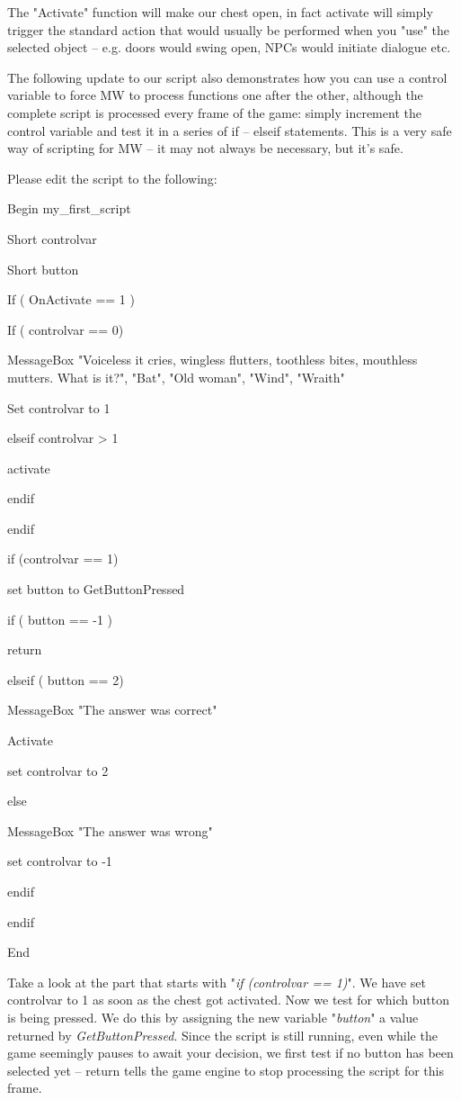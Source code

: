 \documentclass[
]{article}
\begin{document}
The "Activate" function will make our chest open, in fact activate will
simply trigger the standard action that would usually be performed when
you "use" the selected object -- e.g. doors would swing open, NPCs would
initiate dialogue etc.

The following update to our script also demonstrates how you can use a
control variable to force MW to process functions one after the other,
although the complete script is processed every frame of the game:
simply increment the control variable and test it in a series of if --
elseif statements. This is a very safe way of scripting for MW -- it may
not always be necessary, but it's safe.

Please edit the script to the following:

Begin my\_first\_script

Short controlvar

Short button

If ( OnActivate == 1 )

If ( controlvar == 0)

MessageBox "Voiceless it cries, wingless flutters, toothless bites,
mouthless mutters. What is it?", "Bat", "Old woman", "Wind", "Wraith"

Set controlvar to 1

elseif controlvar \textgreater{} 1

activate

endif

endif

if (controlvar == 1)

set button to GetButtonPressed

if ( button == -1 )

return

elseif ( button == 2)

MessageBox "The answer was correct"

Activate

set controlvar to 2

else

MessageBox "The answer was wrong"

set controlvar to -1

endif

endif

End

Take a look at the part that starts with "\emph{if (controlvar == 1)}".
We have set controlvar to 1 as soon as the chest got activated. Now we
test for which button is being pressed. We do this by assigning the new
variable "\emph{button}" a value returned by \emph{GetButtonPressed}.
Since the script is still running, even while the game seemingly pauses
to await your decision, we first test if no button has been selected yet
-- return tells the game engine to stop processing the script for this
frame.
\end{document}

